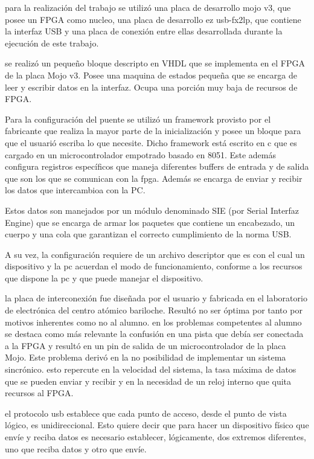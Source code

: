 para la realización del trabajo se utilizó una placa de desarrollo mojo v3, que posee un FPGA como nucleo, una placa de desarrollo ez usb-fx2lp, que contiene la interfaz USB y una placa de conexión entre ellas desarrollada durante la ejecución de este trabajo.

se realizó un pequeño bloque descripto en VHDL que se implementa en el FPGA de la placa Mojo v3. Posee una maquina de estados pequeña que se encarga de leer y escribir datos en la interfaz. Ocupa una porción muy baja de recursos de FPGA.

Para la configuración del puente se utilizó un framework provisto por el fabricante que realiza la mayor parte de la inicialización y posee un bloque para que el usuarió escriba lo que necesite. Dicho framework está escrito en {\micro c} que es cargado en un microcontrolador empotrado basado en 8051. Este además configura registros específicos que maneja diferentes buffers de entrada y de salida que son los que se comunican con la fpga.
Además se encarga de enviar y recibir los datos que intercambioa con la PC.

Estos datos son manejados por un módulo denominado SIE (por Serial Interfaz Engine) que se encarga de armar los paquetes que contiene un encabezado, un cuerpo y una cola que garantizan el correcto cumplimiento de la norma USB.

A su vez, la configuración requiere de un archivo descriptor que es con el cual un dispositivo y la pc acuerdan el modo de funcionamiento, conforme a los recursos que dispone la pc y que puede manejar el dispositivo.

la placa de interconexión fue diseñada por el usuario y fabricada en el laboratorio de electrónica del centro atómico bariloche. Resultó no ser óptima por tanto por motivos inherentes como no al alumno. en los problemas competentes al alumno se destaca como más relevante la confusión en una pista que debía ser conectada a la FPGA y resultó en un pin de salida de un microcontrolador de la placa Mojo. Este problema derivó en la no posibilidad de implementar un sistema sincrónico. esto repercute en la velocidad del sistema, la tasa máxima de datos que se pueden enviar y recibir y en la necesidad de un reloj interno que quita recursos al FPGA.

el protocolo usb establece que cada punto de acceso, desde el punto  de vista lógico, es unidireccional. Esto quiere decir que para hacer un dispositivo físico que envíe y reciba datos es necesario establecer, lógicamente, dos extremos diferentes, uno que reciba datos y otro que envíe.

